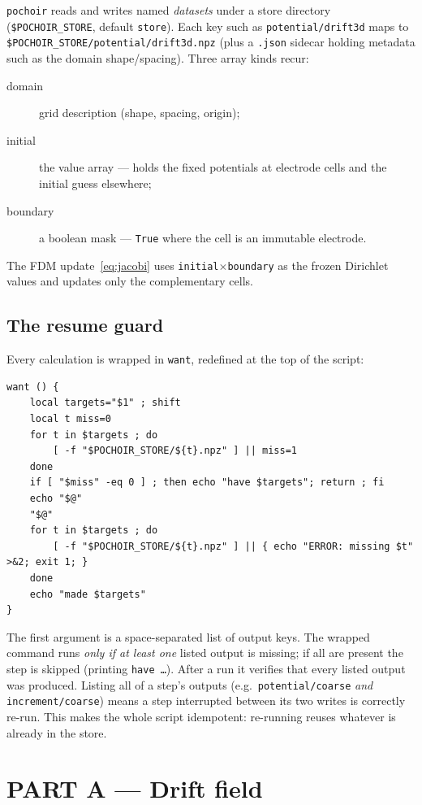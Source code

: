 \documentclass[11pt]{article}
\newcommand{\key}[1]{\texttt{#1}}
\newcommand{\cmd}[1]{\texttt{#1}}
\begin{document}
\cmd{pochoir} reads and writes named \emph{datasets} under a store
directory (\texttt{\$POCHOIR\_STORE}, default \texttt{store}).  Each key
such as \key{potential/drift3d} maps to
\texttt{\$POCHOIR\_STORE/potential/drift3d.npz} (plus a \texttt{.json}
sidecar holding metadata such as the domain shape/spacing).  Three array
kinds recur:
\begin{description}
  \item[domain] grid description (shape, spacing, origin);
  \item[initial] the value array --- holds the fixed potentials at
        electrode cells and the initial guess elsewhere;
  \item[boundary] a boolean mask --- \texttt{True} where the cell is an
        immutable electrode.
\end{description}
The FDM update~\eqref{eq:jacobi} uses \texttt{initial}$\times$\texttt{boundary}
as the frozen Dirichlet values and updates only the complementary cells.

\subsection{The resume guard}

Every calculation is wrapped in \cmd{want}, redefined at the top of the
script:

\begin{lstlisting}
want () {
    local targets="$1" ; shift
    local t miss=0
    for t in $targets ; do
        [ -f "$POCHOIR_STORE/${t}.npz" ] || miss=1
    done
    if [ "$miss" -eq 0 ] ; then echo "have $targets"; return ; fi
    echo "$@"
    "$@"
    for t in $targets ; do
        [ -f "$POCHOIR_STORE/${t}.npz" ] || { echo "ERROR: missing $t" >&2; exit 1; }
    done
    echo "made $targets"
}
\end{lstlisting}

The first argument is a space-separated list of output keys.  The wrapped
command runs \emph{only if at least one} listed output is missing; if all
are present the step is skipped (printing \texttt{have~\ldots}).  After a
run it verifies that every listed output was produced.  Listing all of a
step's outputs (e.g.\ \key{potential/coarse} \emph{and}
\key{increment/coarse}) means a step interrupted between its two writes
is correctly re-run.  This makes the whole script idempotent: re-running
reuses whatever is already in the store.

\section{PART A --- Drift field}
\end{document}
